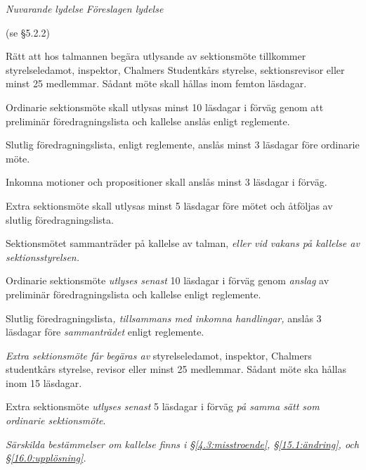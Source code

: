 \documentclass{article}
\newenvironment{lydelse}
    {\begin{paracol}{2}%
        \emph{Nuvarande lydelse}%
        \switchcolumn%
        \emph{Föreslagen lydelse}%
    \end{paracol}%
    \begin{enumerate}[label=\thesubsection.\arabic*]%
    \begin{paracol}{2}%
    }{\end{paracol}\end{enumerate}}
\begin{document}
\begin{lydelse}
  \setcounter{subsection}{3}
  \item[] (se \S 5.2.2)
  \item Rätt att hos talmannen begära utlysande av
    sek\-tions\-möte tillkommer styrelseledamot, inspektor,  Chalmers Studentkårs styrelse, sek\-ti\-ons\-revisor  eller minst 25 medlemmar. Sådant möte skall hållas inom femton läsdagar.

  \item Ordinarie sektionsmöte skall utlysas minst 10 läsdagar i
    förväg genom att preliminär föredragningslista och kallelse an\-slås enligt
    reglemente. 
    
  \item Slutlig föredragningslista, enligt reglemente, anslås minst 3 läsdagar före ordinarie möte. 
    
  \item Inkomna motioner och propositioner skall anslås
    minst 3 läsdagar i förväg.
    
  \item Extra sektionsmöte skall utlysas minst 5 läsdagar före mötet
    och åt\-följ\-as av slutlig föredragningslista.

\switchcolumn
  \item Sektionsmötet sammanträder på kallelse av talman, \emph{eller vid vakans på kallelse av sektionsstyrelsen.}

  \item Ordinarie sektionsmöte \emph{utlyses senast} 10 läsdagar i förväg genom \emph{anslag} av preliminär föredragningslista och kallelse enligt reglemente.

  \item Slutlig föredragningslista\emph{, tillsammans med inkomna handlingar,} anslås 3 läsdagar före \emph{sammanträdet} enligt reglemente.

  \item \emph{Extra sektionsmöte får begäras av} styrelseledamot, inspektor, Chalmers studentkårs styrelse, revisor eller minst 25 medlemmar.
    Sådant möte ska hållas inom 15 läsdagar.
  
  \item Extra sektionsmöte \emph{utlyses senast} 5 läsdagar i förväg \emph{på samma sätt som ordinarie sektionsmöte}.

  \item \emph{Särskilda bestämmelser om kallelse finns i \S\ref{4.3:misstroende}, \S\ref{15.1:ändring}, och \S\ref{16.0:upplösning}.}
\end{lydelse}
\end{document}
